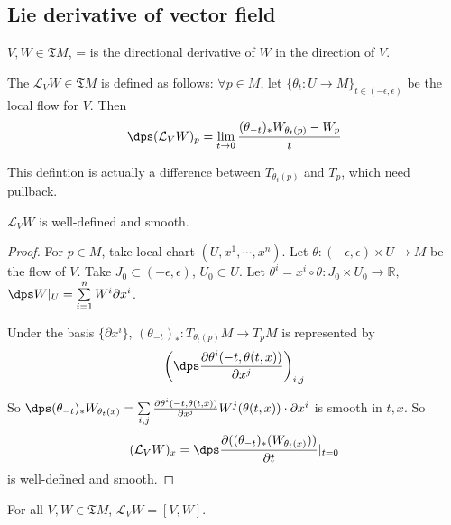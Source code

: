 \subsection{Lie derivative of vector field}
 $ V,W\in \mathfrak{T}M $,  = is the directional derivative of  $ W $ in the direction of  $ V $.
 \begin{definition}
    The   $ \mathcal{L}_VW\in \mathfrak{T}M $ is defined as follows: $ \forall p\in M $, let  $ \{\theta_t:U\rightarrow M\}_{t\in (-\epsilon,\epsilon)} $ be the local flow for  $ V $. Then  \[\dps (\mathcal{L}_VW)_p=\lim\limits_{t\to 0}\frac{(\theta_{-t})_*W_{\theta_t(p)}-W_p}{t} \]    
 \end{definition}
 \begin{remark}
    This defintion is actually a difference between  $ T_{\theta_t(p)} $ and  $ T_p $, which need pullback.  
 \end{remark}
 \begin{lemma}
     $ \mathcal{L}_VW $ is well-defined  and smooth.
 \end{lemma}    
 \begin{proof}
    For  $ p\in M $, take local chart  $ (U,x^1,\cdots,x^n) $. Let  $ \theta :(-\epsilon,\epsilon)\times U\rightarrow M $ be the flow of  $ V $. Take  $ J_0\subset(-\epsilon,\epsilon) $,  $ U_0\subset U $. Let  $ \theta ^i=x^i\circ \theta:J_0\times U_0\rightarrow \mathbb{R} ,  $   $ \dps W|_U=\sum\limits_{i=1}^nW^i\partial x^i $.    
    
    Under the basis  $ \{\partial x^i\} $,  $ (\theta_{-t})_*:T_{\theta_t(p)}M\rightarrow T_pM $ is represented by 
    \[ \left(\dps\frac{\partial \theta^i(-t,\theta(t,x))}{\partial x^j}\right)_{i,j}\]
    
    So  $ \dps(\theta_{-t})_*W_{\theta_t(x)}=\sum\limits_{i,j}\frac{\partial \theta^i(-t,\theta(t,x))}{\partial x^j}W^j(\theta(t,x))\cdot \partial x^i $ is smooth in  $ t,x $.
    So 
    \[(\mathcal{L}_VW)_x=\dps\frac{\partial ((\theta_{-t})_*(W_{\theta_t(x)}))}{\partial t}|_{t=0}\] is well-defined and smooth.  
 \end{proof}
 \begin{theorem}
    For all  $ V,W\in \mathfrak{T}M $,  $ \mathcal{L}_VW=[V,W] $.  
 \end{theorem}
